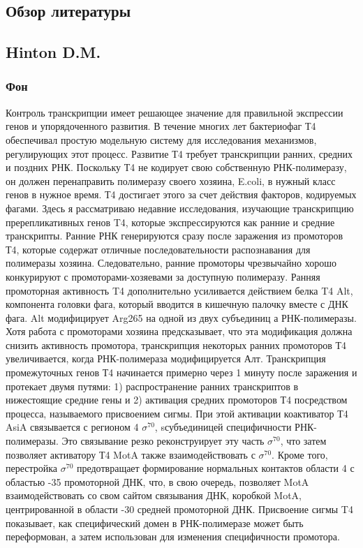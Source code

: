 \documentclass[a4paper,12pt]{article}
\begin{document}
\newpage
\begin{center}
\item \section{Обзор литературы} \label{sec:math}
\item \subsection{Hinton D.M.}
\item \subsubsection{Фон}
\end{center}
        \par{Контроль транскрипции имеет решающее значение для правильной экспрессии генов и упорядоченного развития. В течение
        многих лет бактериофаг Т4 обеспечивал простую модельную систему для исследования механизмов, регулирующих этот
        процесс. Развитие Т4 требует транскрипции ранних, средних и поздних РНК. Поскольку Т4 не кодирует свою собственную
        РНК-полимеразу, он должен перенаправить полимеразу своего хозяина, E.coli, в нужный класс генов в нужное время. Т4
        достигает этого за счет действия факторов, кодируемых фагами. Здесь я рассматриваю недавние исследования, изучающие
        транскрипцию пререпликативных генов T4, которые экспрессируются как ранние и средние транскрипты. Ранние РНК
        генерируются сразу после заражения из промоторов Т4, которые содержат отличные последовательности распознавания для
        полимеразы хозяина. Следовательно, ранние промоторы чрезвычайно хорошо конкурируют с промоторами-хозяевами за
        доступную полимеразу. Ранняя промоторная активность T4 дополнительно усиливается действием белка T4 Alt, компонента
        головки фага, который вводится в кишечную палочку вместе с ДНК фага. Alt модифицирует Arg265 на одной из двух
        субъединиц а РНК-полимеразы. Хотя работа с промоторами хозяина предсказывает, что эта модификация должна снизить
        активность промотора, транскрипция некоторых ранних промоторов Т4 увеличивается, когда РНК-полимераза модифицируется
        Алт. Транскрипция промежуточных генов Т4 начинается примерно через 1 минуту после заражения и протекает двумя путями:
        1) распространение ранних транскриптов в нижестоящие средние гены и 2) активация средних промоторов Т4 посредством
        процесса, называемого присвоением сигмы. При этой активации коактиватор Т4 AsiA связывается с регионом 4
        \(\sigma^{70}\), sсубъединицей специфичности РНК-полимеразы. Это связывание резко реконструирует эту часть
        \(\sigma^{70}\), что затем позволяет активатору Т4 MotA также взаимодействовать с \(\sigma^{70}\). Кроме того,
        перестройка \(\sigma^{70}\) предотвращает формирование нормальных контактов области 4 с областью -35 промоторной ДНК,
        что, в свою очередь, позволяет MotA взаимодействовать со свом сайтом связывания ДНК, коробкой MotA, центрированной в
        области -30 средней промоторной ДНК. Присвоение сигмы T4 показывает, как специфический домен в РНК-полимеразе может
        быть переформован, а затем использован для изменения специфичности промотора. \cite{hinton}}
\end{document}
